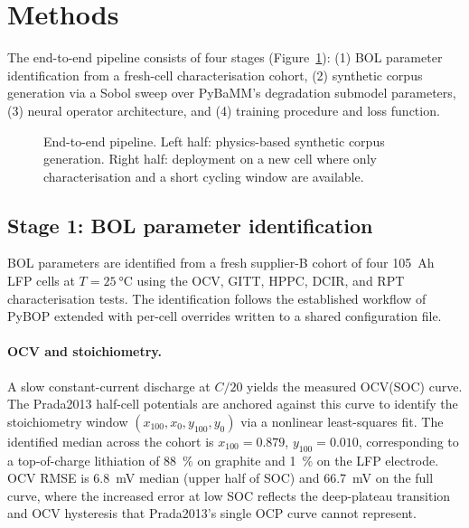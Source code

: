 \documentclass[preprint,12pt,3p,authoryear]{elsarticle}
\begin{document}
\section{Methods}
\label{sec:methods}

The end-to-end pipeline consists of four stages
(Figure~\ref{fig:pipeline}): (1) BOL parameter identification from a
fresh-cell characterisation cohort, (2) synthetic corpus generation via
a Sobol sweep over PyBaMM's degradation submodel parameters, (3) neural
operator architecture, and (4) training procedure and loss function.

\begin{figure}[!t]
    \centering
    \caption{End-to-end pipeline. Left half: physics-based synthetic
    corpus generation. Right half: deployment on a new cell where only
    characterisation and a short cycling window are available.}
    \label{fig:pipeline}
\end{figure}

\subsection{Stage 1: BOL parameter identification}
\label{sec:methods:bol}

BOL parameters are identified from a fresh supplier-B cohort of four
\SI{105}{Ah} LFP cells at \(T = \SI{25}{\celsius}\) using the OCV, GITT,
HPPC, DCIR, and RPT characterisation tests. The identification follows
the established workflow of PyBOP \citep{planden2024pybop} extended with
per-cell overrides written to a shared configuration file.

\paragraph{OCV and stoichiometry.} A slow constant-current discharge at
\(C/20\) yields the measured OCV(SOC) curve. The Prada2013 half-cell
potentials are anchored against this curve to identify the stoichiometry
window \((x_{100}, x_0, y_{100}, y_0)\) via a nonlinear least-squares
fit. The identified median across the cohort is
\(x_{100} = 0.879\), \(y_{100} = 0.010\), corresponding to a
top-of-charge lithiation of \qty{88}{\percent} on graphite and
\qty{1}{\percent} on the LFP electrode. OCV RMSE is \SI{6.8}{\milli\volt}
median (upper half of SOC) and \SI{66.7}{\milli\volt} on the full curve,
where the increased error at low SOC reflects the deep-plateau
transition and OCV hysteresis that Prada2013's single OCP curve cannot
represent.
\end{document}
